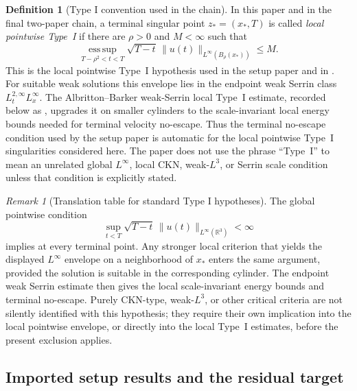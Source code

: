 \documentclass[11pt]{amsart}
\numberwithin{equation}{section}
\theoremstyle{plain}
\theoremstyle{definition}
\newtheorem{definition}[definition]{Definition}
\theoremstyle{remark}
\newtheorem{remark}[remark]{Remark}
\newcommand{\esssup}{\operatorname*{ess\,sup}}
\begin{document}
\begin{definition}[Type I convention used in the chain]
\label{def:pointwise-typeI-convention}
In this paper and in the final two-paper chain, a terminal singular point
\(z_*=(x_*,T)\) is called \emph{local pointwise Type~I} if there are
\(\rho>0\) and \(M<\infty\) such that
\[
   \esssup_{T-\rho^2<t<T}
   \sqrt{T-t}\,\|u(t)\|_{L^\infty(B_\rho(x_*))}\le M .
\]
This is the local pointwise Type~I hypothesis used in the setup paper and in
.  For suitable weak solutions this envelope lies
in the endpoint weak Serrin class \(L^{2,\infty}_tL^\infty_x\).  The
Albritton--Barker weak-Serrin local Type~I estimate, recorded below as
, upgrades it on smaller cylinders to
the scale-invariant local energy bounds needed for terminal velocity
no-escape.  Thus the terminal no-escape condition used by the setup paper is
automatic for the local pointwise Type~I singularities considered here.
The paper does not use the phrase ``Type~I'' to mean an unrelated global
\(L^\infty\), local CKN, weak-\(L^3\), or Serrin scale condition unless that
condition is explicitly stated.
\end{definition}

\begin{remark}[Translation table for standard Type I hypotheses]
\label{rem:typeI-translation-table}
The global pointwise condition
\[
   \sup_{t<T}\sqrt{T-t}\,
      \|u(t)\|_{L^\infty(\mathbb R^3)}<\infty
\]
implies  at every terminal point.  Any
stronger local criterion that yields the displayed \(L^\infty\) envelope on a
neighborhood of \(x_*\) enters the same argument, provided the solution is
suitable in the corresponding cylinder.  The endpoint weak Serrin estimate then
gives the local scale-invariant energy bounds and terminal no-escape.
Purely CKN-type, weak-\(L^3\), or other critical criteria are not silently
identified with this hypothesis; they require their own implication into the
local pointwise envelope, or directly into the local Type~I estimates, before the
present exclusion applies.
\end{remark}

\subsection{Imported setup results and the residual target}
\label{subsec:imported-setup-results}
\end{document}
